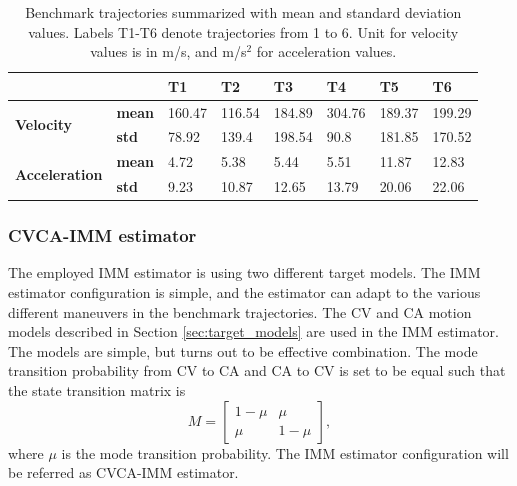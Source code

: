 \documentclass[english, 12pt, a4paper, elec, utf8, a-1b, online]{aaltothesis}
\begin{document}
\begin{table}[htb]
    \centering
\begin{tabular}{|l|l|l|l|l|l|l|l|}
\hline
\multicolumn{2}{|l|}{}                                 & \textbf{T1} & \textbf{T2} & \textbf{T3} & \textbf{T4} & \textbf{T5} & \textbf{T6} \\ \hline
\multirow{2}{*}{\textbf{Velocity}}     & \textbf{mean} & 160.47      & 116.54      & 184.89      & 304.76      & 189.37      & 199.29      \\ \cline{2-8} 
                                       & \textbf{std}  & 78.92       & 139.4       & 198.54      & 90.8        & 181.85      & 170.52      \\ \hline
\multirow{2}{*}{\textbf{Acceleration}} & \textbf{mean} & 4.72        & 5.38        & 5.44        & 5.51        & 11.87       & 12.83       \\ \cline{2-8} 
                                       & \textbf{std}  & 9.23        & 10.87       & 12.65       & 13.79       & 20.06       & 22.06       \\ \hline
\end{tabular}
    \caption{Benchmark trajectories summarized with mean and standard deviation values. Labels T1-T6 denote trajectories from 1 to 6. Unit for velocity values is in m/s, and m/s$^2$ for acceleration values.}
    \label{tab:benchmark_table}
\end{table}


\subsubsection{CVCA-IMM estimator}\label{sec:cvca_imm}

\newcommand{\varcv}{\sigma_\text{cv}^2}
\newcommand{\varca}{\sigma_\text{ca}^2}
\newcommand{\msp}{\mu}

The employed IMM estimator is using two different target models.
The IMM estimator configuration is simple, and the estimator can adapt to the various different maneuvers in the benchmark trajectories.  
The CV and CA motion models described in Section \ref{sec:target_models} are used in the IMM estimator.
The models are simple, but turns out to be effective combination.
The mode transition probability from CV to CA and CA to CV is set to be equal such that the state transition matrix is
\begin{equation}
    M = 
\begin{bmatrix}
1 - \msp & \msp\\ 
\msp & 1 - \msp
\end{bmatrix},
\end{equation}
where $\msp$ is the mode transition probability.
The IMM estimator configuration will be referred as CVCA-IMM estimator.
\end{document}
